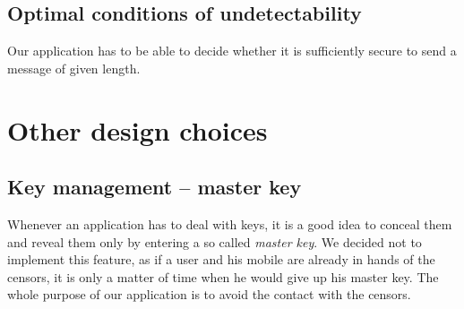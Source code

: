 \subsection{Optimal conditions of undetectability}
Our application has to be able to decide whether it is sufficiently secure to 
send a message of given length. 

\section{Other design choices}

\subsection{Key management -- master key}
Whenever an application has to deal with keys, it is a good idea to conceal them
and reveal them only by entering a so called \emph{master key}. We decided not to implement
this feature, as if a user and his mobile are already in hands of the censors, it is only 
a matter of time when he would give up his master key. The whole purpose of our application
is to avoid the contact with the censors.

